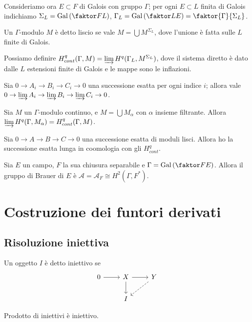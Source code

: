 Consideriamo ora $E\subset F$ di Galois con gruppo $\Gamma$; per ogni $E\subset L$ finita di Galois indichiamo $\Sigma_L=\Gal{F}{L}$, $\Gamma_L=\Gal{L}{E}=\faktor{\Gamma}{\Sigma_L}$.

\begin{definition}
    Un $\Gamma$-modulo $M$ è detto liscio se vale $M=\bigcup M^{\Sigma_L}$, dove l'unione è fatta sulle $L$ finite di Galois.
\end{definition}

\begin{definition}
    Possiamo definire $H^q_{cont}(\Gamma, M)=\varinjlim H^q(\Gamma_L,M^{\Sigma_L})$, dove il sistema diretto è dato dalle $L$ estensioni finite di Galois e le mappe sono le inflazioni.
\end{definition}

\begin{lemma}
    Sia $0\to A_i\to B_i\to C_i\to 0$ una successione esatta per ogni indice $i$; allora vale $0\to \varinjlim A_i\to \varinjlim B_i\to \varinjlim C_i\to0$.
\end{lemma}

\begin{lemma}
    Sia $M$ un $\Gamma$-modulo continuo, e $M=\bigcup M_\alpha$ con $\alpha$ insieme filtrante. Allora $\varinjlim H^q(\Gamma, M_\alpha)=H^q_{cont}(\Gamma, M)$.
\end{lemma}

\begin{theorem}
    Sia $0\to A\to B\to C\to0$ una successione esatta di moduli lisci. Allora ho la successione esatta lunga in coomologia con gli $H^q_{cont}$.
\end{theorem}

\begin{theorem}
    Sia $E$ un campo, $F$ la sua chiusura separabile e $\Gamma=\Gal{F}{E}$. Allora il gruppo di Brauer di $E$ è $\mathcal A=\mathcal A_F\cong H^2(\Gamma, F^\ast)$.    
\end{theorem}

\section{Costruzione dei funtori derivati}

\subsection{Risoluzione iniettiva}

\begin{definition}
    Un oggetto $I$ è detto iniettivo se $$\begin{tikzcd}
    0 \ar[r] & X \ar[d] \ar[r] & Y \ar[dl, dashed] \\
    & I
    \end{tikzcd}$$
\end{definition}
\begin{oss}
    Prodotto di iniettivi è iniettivo.
\end{oss}

